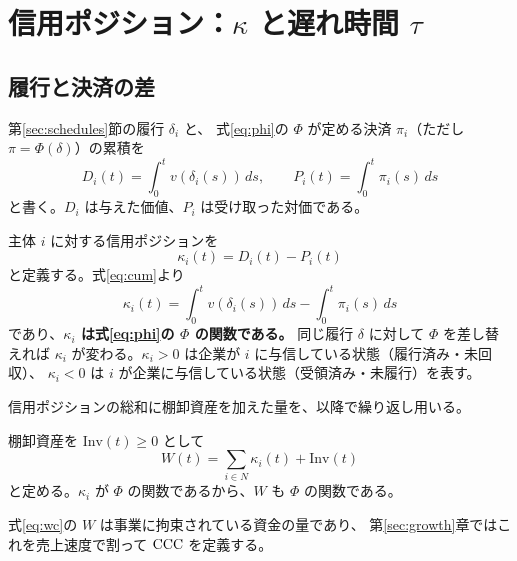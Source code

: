 \chapter{信用ポジション：\texorpdfstring{$\kappa$}{κ} と遅れ時間 \texorpdfstring{$\tau$}{τ}}
\label{sec:kappa}

\section{履行と決済の差}

第\ref{sec:schedules}節の履行 $\delta_i$ と、
式\eqref{eq:phi}の $\Phi$ が定める決済 $\pi_i$（ただし $\pi=\Phi(\delta)$）の累積を
\begin{equation}
D_i(t) = \int_0^t v(\delta_i(s))\,ds, \qquad
P_i(t) = \int_0^t \pi_i(s)\,ds
\label{eq:cum}
\end{equation}
と書く。$D_i$ は与えた価値、$P_i$ は受け取った対価である。

\begin{definition}[信用ポジション]
主体 $i$ に対する信用ポジションを
\begin{equation}
\kappa_i(t) = D_i(t) - P_i(t)
\label{eq:kappa}
\end{equation}
と定義する。式\eqref{eq:cum}より
\[
\kappa_i(t) = \int_0^t v(\delta_i(s))\,ds - \int_0^t \pi_i(s)\,ds
\]
であり、\textbf{$\kappa_i$ は式\eqref{eq:phi}の $\Phi$ の関数である。}
同じ履行 $\delta$ に対して $\Phi$ を差し替えれば $\kappa_i$ が変わる。$\kappa_i>0$ は企業が $i$ に与信している状態（履行済み・未回収）、
$\kappa_i<0$ は $i$ が企業に与信している状態（受領済み・未履行）を表す。
\end{definition}

信用ポジションの総和に棚卸資産を加えた量を、以降で繰り返し用いる。

\begin{definition}[運転資本]
\label{def:wc}
棚卸資産を $\mathrm{Inv}(t)\geq 0$ として
\begin{equation}
W(t) = \sum_{i\in N}\kappa_i(t) + \mathrm{Inv}(t)
\label{eq:wc}
\end{equation}
と定める。$\kappa_i$ が $\Phi$ の関数であるから、$W$ も $\Phi$ の関数である。
\end{definition}

式\eqref{eq:wc}の $W$ は事業に拘束されている資金の量であり、
第\ref{sec:growth}章ではこれを売上速度で割って $\mathrm{CCC}$ を定義する。


